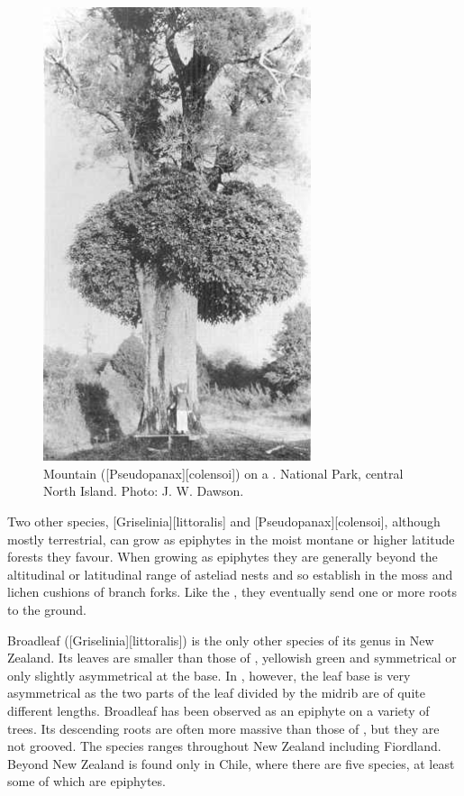 \begin{figure}[htb]
\begin{minipage}[t]{0.567\textwidth}
    	\includegraphics[width=0.7\textwidth]{graphics/figure49fivefinger.jpg}
    	\caption[Mountain five-finger on a kahikatea]{Mountain  ([Pseudopanax][colensoi]) on a .
        National Park, central North Island.
    	Photo: J. W. Dawson.}%
    	\label{fig:49fivefinger}
	\end{minipage}
\end{figure}

Two other species, [Griselinia][littoralis] and [Pseudopanax][colensoi], although mostly terrestrial, can grow as epiphytes in the moist montane or higher latitude forests they favour.
When growing as epiphytes they are generally beyond the altitudinal or latitudinal range of asteliad nests and so establish in the moss and lichen cushions of branch forks.
Like the , they eventually send one or more roots to the ground.

Broadleaf ([Griselinia][littoralis]) is the only other species of its genus in New Zealand.
Its leaves are smaller than those of , yellowish green and symmetrical or only slightly asymmetrical at the base.
In , however, the leaf base is very asymmetrical as the two parts of the leaf divided by the midrib are of quite different lengths.
Broadleaf has been observed as an epiphyte on a variety of trees.
Its descending roots are often more massive than those of , but they are not grooved.
The species ranges throughout New Zealand including Fiordland.
Beyond New Zealand  is found only in Chile, where there are five species, at least some of which are epiphytes.

